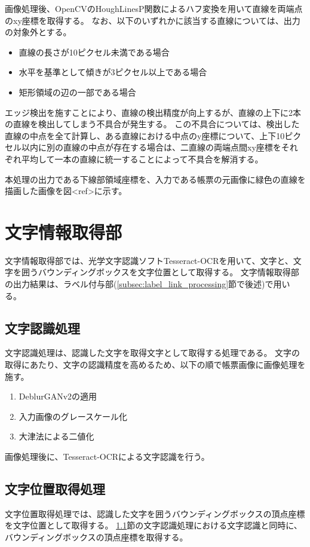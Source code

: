 画像処理後、OpenCVのHoughLinesP関数によるハフ変換を用いて直線を両端点のxy座標を取得する。
なお、以下のいずれかに該当する直線については、出力の対象外とする。

\begin{itemize}
    \item 直線の長さが10ピクセル未満である場合
    \item 水平を基準として傾きが3ピクセル以上である場合
    \item 矩形領域の辺の一部である場合
\end{itemize}

エッジ検出を施すことにより、直線の検出精度が向上するが、直線の上下に2本の直線を検出してしまう不具合が発生する。
この不具合については、検出した直線の中点を全て計算し、ある直線における中点のy座標について、上下10ピクセル以内に別の直線の中点が存在する場合は、二直線の両端点間xy座標をそれぞれ平均して一本の直線に統一することによって不具合を解消する。

本処理の出力である下線部領域座標を、入力である帳票の元画像に緑色の直線を描画した画像を図<ref>に示す。




\section{文字情報取得部}\label{sec:OCR_part}
文字情報取得部では、光学文字認識ソフトTesseract-OCRを用いて、文字と、文字を囲うバウンディングボックスを文字位置として取得する。
文字情報取得部の出力結果は、ラベル付与部(\ref{subsec:label_link_processing}節で後述)で用いる。

\subsection{文字認識処理}\label{subsec:char_recognition_processing}
文字認識処理は、認識した文字を取得文字として取得する処理である。
文字の取得にあたり、文字の認識精度を高めるため、以下の順で帳票画像に画像処理を施す。

\begin{enumerate}
    \item DeblurGANv2の適用
    \item 入力画像のグレースケール化
    \item 大津法による二値化
\end{enumerate}

画像処理後に、Tesseract-OCRによる文字認識を行う。

\subsection{文字位置取得処理}\label{subsec:char_position_obtainment_processing}
文字位置取得処理では、認識した文字を囲うバウンディングボックスの頂点座標を文字位置として取得する。
\ref{subsec:char_recognition_processing}節の文字認識処理における文字認識と同時に、バウンディングボックスの頂点座標を取得する。

